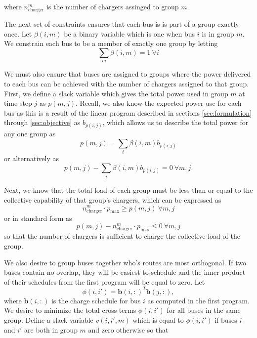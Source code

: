 where $n_{\text{charger}}^m$ is the number of chargers assinged to group $m$.
\par The next set of constraints ensures that each bus is is part of a group exactly once. Let $\beta(i,m)$ be a binary variable which is one when bus $i$ is in group $m$. We constrain each bus to be a member of exactly one group by letting
\begin{equation*}
	\sum_m\beta(i,m) = 1 \ \forall i
\end{equation*}
\par We must also ensure that buses are assigned to groups where the power delivered to each bus can be achieved with the number of chargers assigned to that group. First, we define a slack variable which gives the total power used in group $m$ at time step $j$ as $p(m,j)$. Recall, we also know the expected power use for each bus as this is a result of the linear program described in sections \ref{sec:formulation} through \ref{sec:objective} as $b_{p(i,j)}$, which allows us to describe the total power for any one group as
\begin{equation*}
 p(m,j) = \sum_i\beta(i,m)b_{p(i,j)}
\end{equation*}
or alternatively as
\begin{equation}
	p(m,j) - \sum_i\beta(i,m)b_{p(i,j)} = 0 \ \forall m,j.
\end{equation} 
\par Next, we know that the total load of each group must be less than or equal to the collective capability of that group's chargers, which can be expressed as
\begin{equation*}
	n^m_{\text{charger}}\cdot p_{\text{max}} \ge p(m,j) \ \forall m,j
\end{equation*}
or in standard form as 
\begin{equation}
	p(m,j) - n^m_{\text{charger}}\cdot p_{\text{max}} \le 0\ \forall m,j
\end{equation}
so that the number of chargers is sufficient to charge the collective load of the group. 
\par We also desire to group buses together who's routes are most orthogonal. If two buses contain no overlap, they will be easiest to schedule and the inner product of their schedules from the first program will be equal to zero. Let 
\begin{equation*}
\phi(i,i') = \mathbf{b}(i,:)^T\mathbf{b}(j,:),
\end{equation*}
where $\mathbf{b}(i,:)$ is the charge schedule for bus $i$ as computed in the first program. We desire to minimize the total cross terms $\phi(i,i')$ for all buses in the same group.  Define a slack variable $v(i,i',m)$ which is equal to $\phi(i,i')$ if buses $i$ and $i'$ are both in group $m$ and zero otherwise so that
